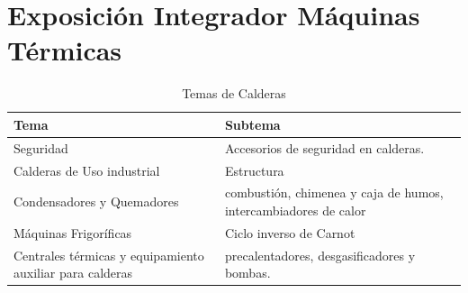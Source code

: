\documentclass[../main]{subfiles}
\begin{document}
\chapter{Exposición Integrador Máquinas Térmicas}


    \begin{table}[h!]
        \centering
        \begin{tabular}{|p{5cm} | p{10cm} |} \hline
            Tema & Subtema \\ \hline \hline 
             Seguridad & Accesorios de seguridad en calderas.\\ \hline 
             Calderas de Uso industrial & Estructura  \\ \hline
             Condensadores y Quemadores & combustión, chimenea y caja de humos, intercambiadores de calor\\ \hline
             Máquinas Frigoríficas& Ciclo inverso de Carnot\\ \hline
             Centrales térmicas y equipamiento auxiliar para calderas& precalentadores, desgasificadores y bombas.\\ \hline 
        \end{tabular}
        \caption{Temas de Calderas}
        
    \end{table}
\end{document}
